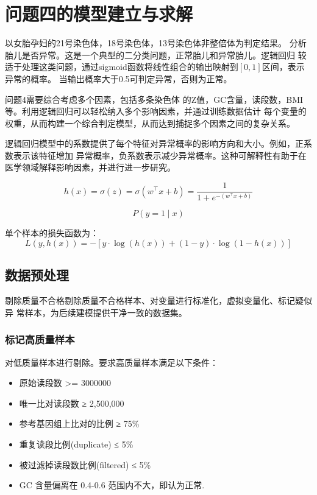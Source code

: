 \documentclass[withoutpreface,notoc]{cumcmthesis}
\begin{document}
	\section{问题四的模型建立与求解}

	以女胎孕妇的21号染色体，18号染色体，13号染色体非整倍体为判定结果。
	分析胎儿是否异常。这是一个典型的二分类问题，正常胎儿和异常胎儿。逻辑回归
	较适于处理这类问题，通过sigmoid函数将线性组合的输出映射到$[0,1]$区间，表示异常的概率。
	当输出概率大于0.5可判定异常，否则为正常。
	
	问题4需要综合考虑多个因素，包括多条染色体
	的Z值，GC含量，读段数，BMI等。利用逻辑回归可以轻松纳入多个影响因素，并通过训练数据估计
	每个变量的权重，从而构建一个综合判定模型，从而达到捕捉多个因素之间的复杂关系。

	逻辑回归模型中的系数提供了每个特征对异常概率的影响方向和大小。例如，正系数表示该特征增加
	异常概率，负系数表示减少异常概率。这种可解释性有助于在医学领域解释影响因素，并进行进一步研究。









	\begin{equation}
	h(x) = \sigma(z) = \sigma(w^\top x + b) = \frac{1}{1 + e^{-(w^\top x + b)}}
	\end{equation}

	\begin{equation}
	P(y=1 \mid x)
	\end{equation}


	单个样本的损失函数为：
	\begin{equation}
	L(y, h(x)) = - [y \cdot \log(h(x)) + (1 - y) \cdot \log(1 - h(x))]
	\end{equation}







	\subsection{数据预处理}
	剔除质量不合格剔除质量不合格样本、对变量进行标准化，虚拟变量化、标记疑似异
	常样本，为后续建模提供干净一致的数据集。

	\subsubsection{标记高质量样本}

	对低质量样本进行剔除。要求高质量样本满足以下条件：
	\begin{itemize}
		\item 原始读段数 >= 3000000
		\item 唯一比对读段数 ≥ 2,500,000
		\item 参考基因组上比对的比例 ≥ 75\%
		\item 重复读段比例(duplicate) ≤ 5\%
		\item 被过滤掉读段数比例(filtered) ≤ 5\%
		\item GC 含量偏离在 0.4-0.6 范围内不大，即认为正常.
	\end{itemize}
\end{document}
